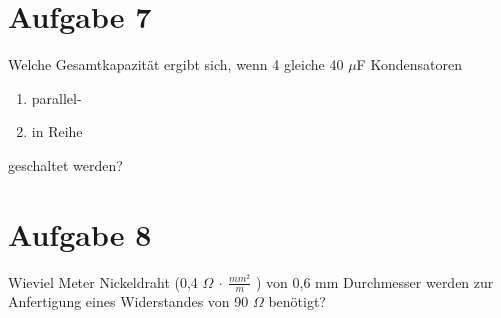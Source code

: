 \documentclass[a4paper, 11pt]{article}
\begin{document}
\section*{Aufgabe 7}
Welche Gesamtkapazität ergibt sich, wenn 4 gleiche 40 $\mu$F Kondensatoren
\begin{enumerate}
\item parallel-
\item in Reihe
\end{enumerate}
geschaltet werden?

\section*{Aufgabe 8}
Wieviel Meter Nickeldraht (0,4 $\Omega\ \cdot\ \frac{mm^{2}}{m}$ ) von 0,6 mm Durchmesser werden zur Anfertigung eines Widerstandes von 90 $\Omega$ benötigt?
\end{document}
